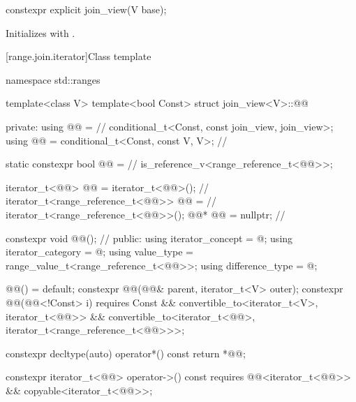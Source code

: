 %
\begin{itemdecl}
constexpr explicit join_view(V base);
\end{itemdecl}

\begin{itemdescr}
\pnum
\effects
Initializes  with .
\end{itemdescr}

[range.join.iterator]{Class template }

%
\begin{codeblock}
namespace std::ranges {
template<class V>
  template<bool Const>
  struct join_view<V>::@@ {
  private:
    using @@ =                                              // \expos
      conditional_t<Const, const join_view, join_view>;
    using @@   = conditional_t<Const, const V, V>;            // \expos

    static constexpr bool @@ =                      // \expos
      is_reference_v<range_reference_t<@@>>;

    iterator_t<@@> @@ = iterator_t<@@>();               // \expos
    iterator_t<range_reference_t<@@>> @@ =                // \expos
      iterator_t<range_reference_t<@@>>();
    @@* @@ = nullptr;                                  // \expos

    constexpr void @@();                                   // \expos
  public:
    using iterator_concept  = @\seebelow@;
    using iterator_category = @\seebelow@;
    using value_type        = range_value_t<range_reference_t<@@>>;
    using difference_type   = @\seebelow@;

    @@() = default;
    constexpr @@(@@& parent, iterator_t<V> outer);
    constexpr @@(@@<!Const> i)
      requires Const &&
               convertible_to<iterator_t<V>, iterator_t<@@>> &&
               convertible_to<iterator_t<@@>,
                              iterator_t<range_reference_t<@@>>>;

    constexpr decltype(auto) operator*() const { return *@@; }

    constexpr iterator_t<@@> operator->() const
      requires @@<iterator_t<@@>> && copyable<iterator_t<@@>>;

}}
\end{codeblock}
